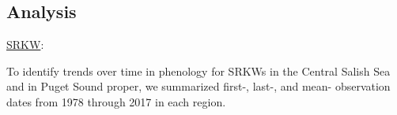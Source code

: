 \documentclass{article}
\begin{document}
\subsection* {Analysis}
\underline{SRKW}:
\par To identify trends over time in phenology for SRKWs in the Central Salish Sea and in Puget Sound proper, we summarized first-, last-, and mean- observation dates from 1978 through 2017 in each region. %
\end{document}
